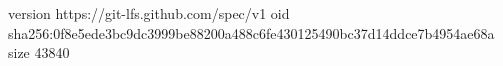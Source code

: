 version https://git-lfs.github.com/spec/v1
oid sha256:0f8e5ede3bc9dc3999be88200a488c6fe430125490bc37d14ddce7b4954ae68a
size 43840
